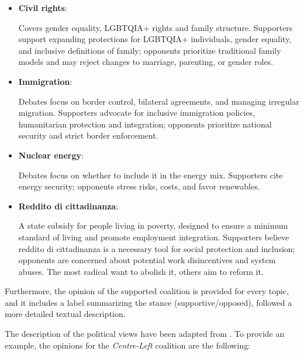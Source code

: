 \begin{itemize}
    \item \textbf{Civil rights}:
        \begin{tcolorbox}[prompt]
            Covers gender equality, LGBTQIA+ rights and family structure. Supporters support expanding protections for LGBTQIA+ individuals, gender equality, and inclusive definitions of family; opponents prioritize traditional family models and may reject changes to marriage, parenting, or gender roles.
        \end{tcolorbox}

    \item \textbf{Immigration}:
        \begin{tcolorbox}[prompt]
            Debates focus on border control, bilateral agreements, and managing irregular migration. Supporters advocate for inclusive immigration policies, humanitarian protection and integration; opponents prioritize national security and strict border enforcement.
        \end{tcolorbox}

    \item \textbf{Nuclear energy}:
        \begin{tcolorbox}[prompt]
            Debates focus on whether to include it in the energy mix. Supporters cite energy security; opponents stress risks, costs, and favor renewables.
        \end{tcolorbox}

    \item \textbf{Reddito di cittadinanza}:
        \begin{tcolorbox}[prompt]
            A state subsidy for people living in poverty, designed to ensure a minimum standard of living and promote employment integration. Supporters believe reddito di cittadinanza is a necessary tool for social protection and inclusion; opponents are concerned about potential work disincentives and system abuses. The most radical want to abolish it, others aim to reform it.
        \end{tcolorbox}    
\end{itemize}


Furthermore, the opinion of the supported coalition is provided for every topic, and it includes a label summarizing the stance (supportive/opposed), followed a more detailed textual description.

The description of the political views have been adapted from \cite{wired2022elezioni12punti, ilpost2022partiti, pagellapolitica2022confronto, pagellapolitica2022programmi}.
To provide an example, the opinions for the \textit{Centre-Left} coalition are the following:

